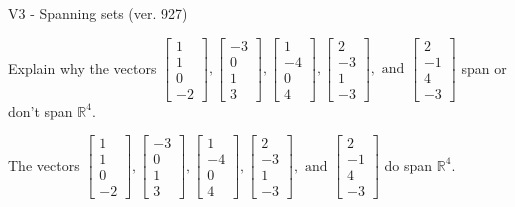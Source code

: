 \begin{exercise}
  \begin{exerciseTitle}V3 - Spanning sets (ver. 927)\end{exerciseTitle}
  \begin{exerciseStatement}
    Explain why the vectors \(\left[\begin{array}{r}
1 \\
1 \\
0 \\
-2
\end{array}\right] , \left[\begin{array}{r}
-3 \\
0 \\
1 \\
3
\end{array}\right] , \left[\begin{array}{r}
1 \\
-4 \\
0 \\
4
\end{array}\right] , \left[\begin{array}{r}
2 \\
-3 \\
1 \\
-3
\end{array}\right] , \text{ and } \left[\begin{array}{r}
2 \\
-1 \\
4 \\
-3
\end{array}\right]\) span or don't span \(\mathbb{R}^4\). 
	


  \end{exerciseStatement}
  \begin{exerciseAnswer}
   The vectors \(\left[\begin{array}{r}
1 \\
1 \\
0 \\
-2
\end{array}\right] , \left[\begin{array}{r}
-3 \\
0 \\
1 \\
3
\end{array}\right] , \left[\begin{array}{r}
1 \\
-4 \\
0 \\
4
\end{array}\right] , \left[\begin{array}{r}
2 \\
-3 \\
1 \\
-3
\end{array}\right] , \text{ and } \left[\begin{array}{r}
2 \\
-1 \\
4 \\
-3
\end{array}\right]\) 
  	 do  
	span \(\mathbb{R}^4\).
  


  \end{exerciseAnswer}
\end{exercise}